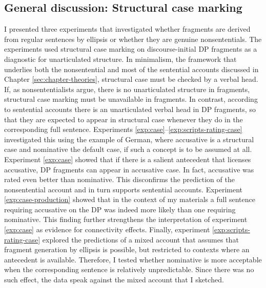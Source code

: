 \subsection{General discussion: Structural case marking}
I presented three experiments that investigated whether fragments are derived from regular sentences by ellipsis or whether they are genuine nonsententials. The experiments used structural case marking on discourse-initial DP fragments as a diagnostic for unarticulated structure. In minimalism, the framework that underlies both the nonsentential and most of the sentential accounts discussed in Chapter \ref{sec:chapter-theories}, structural case must be checked by a verbal head. If, as nonsententialists argue, there is no unarticulated structure in fragments, structural case marking must be unavailable in fragments. In contrast, according to sentential accounts there is an unarticulated verbal head in DP fragments, so that they are expected to appear in structural case whenever they do in the corresponding full sentence. Experiments \ref{exp:case}--\ref{exp:scripts-rating-case} investigated this using the example of German, where accusative is a structural case and nominative the default case, if such a concept is to be assumed at all. Experiment \ref{exp:case} showed that if there is a salient antecedent that licenses accusative, DP fragments can appear in accusative case. In fact, accusative was rated even better than nominative. This disconfirms the prediction of the nonsentential account and in turn supports sentential accounts. Experiment \ref{exp:case-production} showed that in the context of my materials a full sentence requiring accusative on the DP was indeed more likely than one requiring nominative. This finding further strengthens the interpretation of experiment \ref{exp:case} as evidence for connectivity effects. Finally, experiment \ref{exp:scripts-rating-case} explored the predictions of a mixed account that assumes that fragment generation by ellipsis is possible, but restricted to contexts where an antecedent is available. Therefore, I tested whether nominative is more acceptable when the corresponding sentence is relatively unpredictable. Since there was no such effect, the data speak against the mixed account that I sketched.

